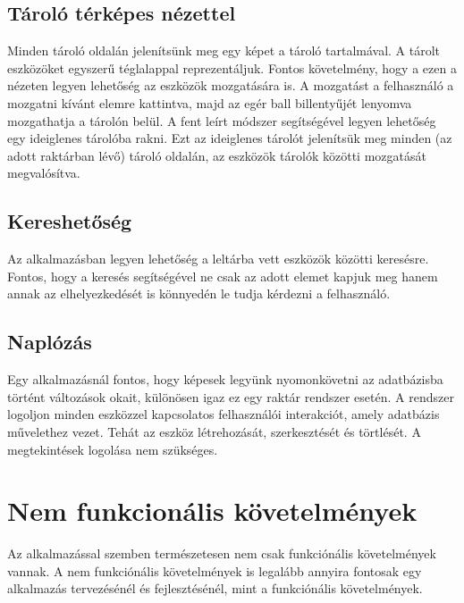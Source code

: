 \subsection{Tároló térképes nézettel}
Minden tároló oldalán jelenítsünk meg egy képet a tároló tartalmával.
A tárolt eszközöket egyszerű téglalappal reprezentáljuk.
Fontos követelmény, hogy a ezen a nézeten legyen lehetőség az eszközök mozgatására is.
A mozgatást a felhasználó a mozgatni kívánt elemre kattintva, majd az egér ball billentyűjét lenyomva mozgathatja a tárolón belül.
A fent leírt módszer segítségével legyen lehetőség egy ideiglenes tárolóba rakni. 
Ezt az ideiglenes tárolót jelenítsük meg minden (az adott raktárban lévő) tároló oldalán, az eszközök tárolók közötti mozgatását megvalósítva.

\subsection{Kereshetőség}
Az alkalmazásban legyen lehetőség a leltárba vett eszközök közötti keresésre.
Fontos, hogy a keresés segítségével ne csak az adott elemet kapjuk meg hanem annak az elhelyezkedését is könnyedén le tudja kérdezni a felhasználó.

\subsection{Naplózás}
Egy alkalmazásnál fontos, hogy képesek legyünk nyomonkövetni az adatbázisba történt változások okait, különösen igaz ez egy raktár rendszer esetén.
A rendszer logoljon minden eszközzel kapcsolatos felhasználói interakciót, amely adatbázis művelethez vezet.
Tehát az eszköz létrehozását, szerkesztését és törtlését. A megtekintések logolása nem szükséges.

\section{Nem funkcionális követelmények}

Az alkalmazással szemben természetesen nem csak funkciónális követelmények vannak.
A nem funkciónális követelmények is legalább annyira fontosak egy alkalmazás tervezésénél és fejlesztésénél, mint a funkciónális követelmények.

